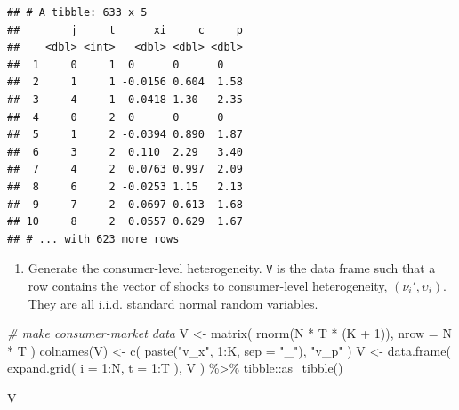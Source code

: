 \documentclass[
]{book}
\newenvironment{Shaded}{\begin{snugshade}}{\end{snugshade}}
\newcommand{\AttributeTok}[1]{\textcolor[rgb]{0.77,0.63,0.00}{#1}}
\newcommand{\CommentTok}[1]{\textcolor[rgb]{0.56,0.35,0.01}{\textit{#1}}}
\newcommand{\DecValTok}[1]{\textcolor[rgb]{0.00,0.00,0.81}{#1}}
\newcommand{\FunctionTok}[1]{\textcolor[rgb]{0.00,0.00,0.00}{#1}}
\newcommand{\NormalTok}[1]{#1}
\newcommand{\OtherTok}[1]{\textcolor[rgb]{0.56,0.35,0.01}{#1}}
\newcommand{\SpecialCharTok}[1]{\textcolor[rgb]{0.00,0.00,0.00}{#1}}
\newcommand{\StringTok}[1]{\textcolor[rgb]{0.31,0.60,0.02}{#1}}
\providecommand{\tightlist}{%
  \setlength{\itemsep}{0pt}\setlength{\parskip}{0pt}}
\begin{document}
\begin{verbatim}
## # A tibble: 633 x 5
##        j     t      xi     c     p
##    <dbl> <int>   <dbl> <dbl> <dbl>
##  1     0     1  0      0      0   
##  2     1     1 -0.0156 0.604  1.58
##  3     4     1  0.0418 1.30   2.35
##  4     0     2  0      0      0   
##  5     1     2 -0.0394 0.890  1.87
##  6     3     2  0.110  2.29   3.40
##  7     4     2  0.0763 0.997  2.09
##  8     6     2 -0.0253 1.15   2.13
##  9     7     2  0.0697 0.613  1.68
## 10     8     2  0.0557 0.629  1.67
## # ... with 623 more rows
\end{verbatim}

\begin{enumerate}
\def\labelenumi{\arabic{enumi}.}
\setcounter{enumi}{3}
\tightlist
\item
  Generate the consumer-level heterogeneity. \texttt{V} is the data frame such that a row contains the vector of shocks to consumer-level heterogeneity, \((\nu_{i}', \upsilon_i)\). They are all i.i.d. standard normal random variables.
\end{enumerate}

\begin{Shaded}
\begin{Highlighting}[]
\CommentTok{\# make consumer{-}market data}
\NormalTok{V }\OtherTok{\textless{}{-}} 
  \FunctionTok{matrix}\NormalTok{(}
    \FunctionTok{rnorm}\NormalTok{(N }\SpecialCharTok{*}\NormalTok{ T }\SpecialCharTok{*}\NormalTok{ (K }\SpecialCharTok{+} \DecValTok{1}\NormalTok{)), }
    \AttributeTok{nrow =}\NormalTok{ N }\SpecialCharTok{*}\NormalTok{ T}
\NormalTok{    ) }
\FunctionTok{colnames}\NormalTok{(V) }\OtherTok{\textless{}{-}} 
  \FunctionTok{c}\NormalTok{(}
    \FunctionTok{paste}\NormalTok{(}\StringTok{"v\_x"}\NormalTok{, }\DecValTok{1}\SpecialCharTok{:}\NormalTok{K, }\AttributeTok{sep =} \StringTok{"\_"}\NormalTok{), }
    \StringTok{"v\_p"}
\NormalTok{    )}
\NormalTok{V }\OtherTok{\textless{}{-}} 
  \FunctionTok{data.frame}\NormalTok{(}
    \FunctionTok{expand.grid}\NormalTok{(}
      \AttributeTok{i =} \DecValTok{1}\SpecialCharTok{:}\NormalTok{N, }
      \AttributeTok{t =} \DecValTok{1}\SpecialCharTok{:}\NormalTok{T}
\NormalTok{      ),}
\NormalTok{    V}
\NormalTok{    ) }\SpecialCharTok{\%\textgreater{}\%}
\NormalTok{  tibble}\SpecialCharTok{::}\FunctionTok{as\_tibble}\NormalTok{()}
\end{Highlighting}
\end{Shaded}

\begin{Shaded}
\begin{Highlighting}[]
\NormalTok{V}
\end{Highlighting}
\end{Shaded}
\end{document}
